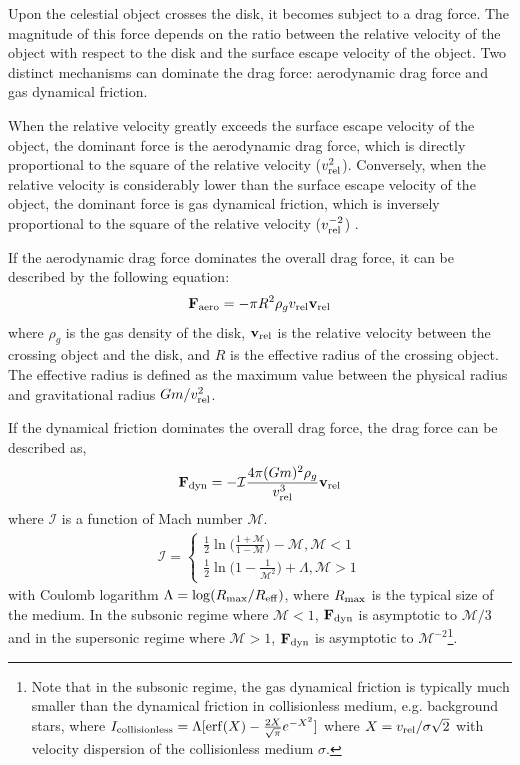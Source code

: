 \documentclass[fleqn,usenatbib]{mnras}
\begin{document}
Upon the celestial object crosses the disk, it becomes subject to a drag force. The magnitude of this force depends on the ratio between the relative velocity of the object with respect to the disk and the surface escape velocity of the object. Two distinct mechanisms can dominate the drag force: aerodynamic drag force and gas dynamical friction.

When the relative velocity greatly exceeds the surface escape velocity of the object, the dominant force is the aerodynamic drag force, which is directly proportional to the square of the relative velocity ($v_{\rm rel}^2$). Conversely, when the relative velocity is considerably lower than the surface escape velocity of the object, the dominant force is gas dynamical friction, which is inversely proportional to the square of the relative velocity ($v_{\rm rel}^{-2}$) \citep{Ostriker1999}.

If the aerodynamic drag force dominates the overall drag force, it can be described by the following equation:
\begin{equation}
    \mathbf{F}_{\rm aero} = -\pi R^2 \rho_g {v}_{\rm rel} \mathbf{v}_{\rm rel}\label{eq:f_aero}
\end{equation}
where $\rho_g$ is the gas density of the disk, $\mathbf{v}_{\rm rel}$ is the relative velocity between the crossing object and the disk, and $R$ is the effective radius of the crossing object. The effective radius is defined as the maximum value between the physical radius and gravitational radius $Gm/v_{\rm rel}^2$.

If the dynamical friction dominates the overall drag force, the drag force can be described as,
\begin{equation}
    \mathbf{F}_{\rm dyn} = -\mathcal{I}\frac{4\pi(Gm)^2\rho_g}{v^3_{\rm rel}}  \mathbf{v}_{\rm rel}\label{eq:f_dyn}
\end{equation}
where $\mathcal{I}$ is a function of Mach number $\mathcal{M}$.
\begin{eqnarray*}
\mathcal{I}=\left\{
\begin{aligned}
    \frac{1}{2}\ln\bigg(\frac{1+\mathcal{M}}{1-\mathcal{M}}\bigg)-\mathcal{M}, \mathcal{M}<1\\
    \frac{1}{2}\ln\bigg(1-\frac{1}{\mathcal{M}^2}\bigg)+\Lambda,\mathcal{M}>1
\end{aligned}
\right.
\end{eqnarray*}
with Coulomb logarithm $\Lambda = \log(R_{\rm max}/R_{\rm eff})$, where $R_{\rm max}$ is the typical size of the medium. In the subsonic regime where $\mathcal{M}<1$, $\mathbf{F}_{\rm dyn}$ is asymptotic to $\mathcal{M}/3$ and in the supersonic regime where $\mathcal{M}>1$, $\mathbf{F}_{\rm dyn}$ is asymptotic to $\mathcal{M}^{-2}$\footnote{Note that in the subsonic regime, the gas dynamical friction is typically much smaller than the dynamical friction in collisionless medium, e.g. background stars, where
$I_{\rm collisionless}=\Lambda[{\rm erf}(X) - \frac{2X}{\sqrt{\pi}}e^{-X^2}]$
where $X={v_{\rm rel}}/{\sigma\sqrt{2}}$ with velocity dispersion of the collisionless medium $\sigma$.}.
\end{document}
